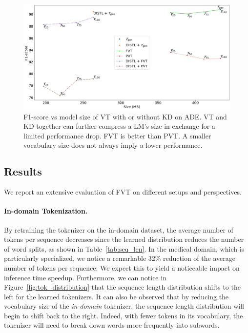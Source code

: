 \documentclass[11pt]{article}
\begin{document}
\begin{figure}[ht]
  \centering
  \includegraphics[width=\columnwidth]{images/results_ADE.png} %
  \caption{F1-score vs model size of VT with or without KD on ADE. VT and KD together can further compress a LM's size in exchange for a limited performance drop. FVT is better than PVT. A smaller vocabulary size does not always imply a lower performance.}\label{fig:2d_size_f1f1}
\end{figure}

\subsection{Results}
We report an extensive evaluation of FVT on different setups and perspectives.

\paragraph{In-domain Tokenization.}
By retraining the tokenizer on the in-domain dataset, the average number of tokens per sequence decreases since the learned distribution reduces the number of word splits, as shown in Table~\ref{tab:seq_len}. In the medical domain, which is particularly specialized, we notice a remarkable 32\% reduction of the average number of tokens per sequence. We expect this to yield a noticeable impact on inference time speedup. Furthermore, we can notice in Figure~\ref{fig:tok_distribution} that the sequence length distribution shifts to the left for the learned tokenizers. It can also be observed that by reducing the vocabulary size of the \textit{in-domain} tokenizer, the sequence length distribution will begin to shift back to the right. Indeed, with fewer tokens in its vocabulary, the tokenizer will need to break down words more frequently into subwords.
\end{document}
